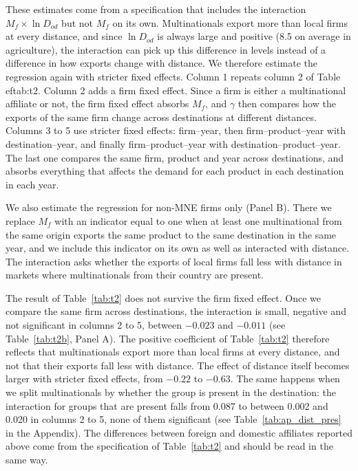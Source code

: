 \documentclass[11pt,a4paper]{article}
\begin{document}
These estimates come from a specification that includes the interaction $M_f \times \ln D_{od}$
but not $M_f$ on its own. Multinationals export more than local
firms at every distance, and since $\ln D_{od}$ is always large and positive (8.5 on average in
agriculture), the interaction can pick up this difference in levels instead of a difference in how
exports change with distance. We therefore estimate the regression again with stricter fixed
effects. Column 1 repeats column 2 of Table~
ef{tab:t2}. Column 2 adds a firm fixed effect. Since a firm
is either a multinational affiliate or not, the firm fixed effect absorbs $M_f$, and $\gamma$ then
compares how the exports of the same firm change across destinations at different distances.
Columns 3 to 5 use stricter fixed effects: firm--year, then firm--product--year with
destination--year, and finally firm--product--year with destination--product--year. The last one
compares the same firm, product and year across destinations, and absorbs everything that affects
the demand for each product in each destination in each year.

We also estimate the regression for non-MNE firms only (Panel B). There we replace $M_f$ with an
indicator equal to one when at least one multinational from the same origin exports the same product
to the same destination in the same year, and we include this indicator on its own as well as
interacted with distance. The interaction asks whether the exports of local firms fall less with
distance in markets where multinationals from their country are present.

The result of Table~\ref{tab:t2} does not survive the firm fixed effect. Once we compare the
same firm across destinations, the interaction is small, negative and not significant in columns 2
to 5, between $-0.023$ and $-0.011$ (see Table~\ref{tab:t2b}, Panel A). The positive coefficient of
Table~\ref{tab:t2} therefore reflects that multinationals export more than local firms at
every distance, and not that their exports fall less with distance. The effect of distance itself
becomes larger with stricter fixed effects, from $-0.22$ to $-0.63$. The same happens when we split
multinationals by whether the group is present in the destination: the interaction for groups that
are present falls from 0.087 to between 0.002 and 0.020 in columns 2 to 5, none of them significant
(see Table~\ref{tab:ap_dist_pres} in the Appendix). The differences between foreign and domestic
affiliates reported above come from the specification of Table~\ref{tab:t2} and should be read in
the same way.
\end{document}
